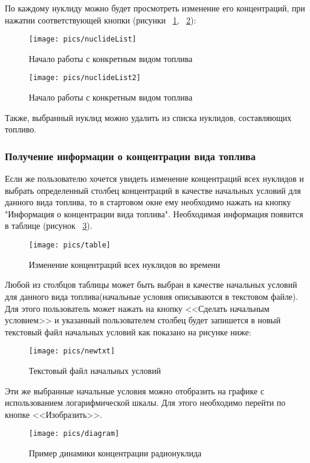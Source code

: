По каждому нуклиду можно будет просмотреть изменение его концентраций, при нажатии соответствующей кнопки (рисунки ~\ref{fig:nuclideList}, ~\ref{fig:nuclideList2}):

\begin{figure}[H]
	\centering
	\texttt{[image: pics/nuclideList]}
	\caption{Начало работы с конкретным видом топлива}
	\label{fig:nuclideList}
\end{figure}

\begin{figure}[H]
	\centering
	\texttt{[image: pics/nuclideList2]}
	\caption{Начало работы с конкретным видом топлива}
	\label{fig:nuclideList2}
\end{figure}

Также, выбранный нуклид можно удалить из списка нуклидов, составляющих топливо.

\subsubsection{Получение информации о концентрации вида топлива} 

Если же пользователю хочется увидеть изменение концентраций всех нуклидов и выбрать определенный столбец концентраций в качестве начальных условий для данного вида топлива, то в стартовом окне ему необходимо нажать на кнопку "Информация о концентрации вида топлива". Необходимая информация появится в таблице (рисунок  ~\ref{fig:table}). 

\begin{figure}[H]
	\centering
	\texttt{[image: pics/table]}
	\caption{Изменение концентраций всех нуклидов во времени}
	\label{fig:table}
\end{figure}

Любой из столбцов таблицы может быть выбран в качестве начальных условий для данного вида топлива(начальные условия описываются в текстовом файле). Для этого пользователь может нажать на кнопку <<Сделать начальным условием>> и указанный пользователем столбец будет запишется в новый текстовый файл начальных условий как показано на рисунке ниже:

\begin{figure}[H]
	\centering
	\texttt{[image: pics/newtxt]}
	\caption{Текстовый файл начальных условий}
	\label{fig:newtxt}
\end{figure}

Эти же выбранные начальные условия можно отобразить на графике с использованием логарифмической шкалы. Для этого необходимо перейти по кнопке <<Изобразить>>. 

\begin{figure}[H]
	\centering
	\texttt{[image: pics/diagram]}
	\caption{Пример динамики концентрации радионуклида}
	\label{fig:diagram}
\end{figure}


